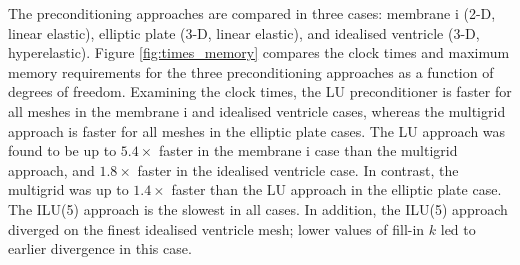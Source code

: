 \documentclass[sn-mathphys,Numbered]{sn-jnl}%
\begin{document}
The preconditioning approaches are compared in three cases: membrane i (2-D, linear elastic), elliptic plate (3-D, linear elastic), and idealised ventricle (3-D, hyperelastic).
 Figure \ref{fig:times_memory} compares the clock times and maximum memory requirements for the three preconditioning approaches as a function of degrees of freedom.
 Examining the clock times, the LU preconditioner is faster for all meshes in the membrane i and idealised ventricle cases, whereas the multigrid approach is faster for all meshes in the elliptic plate cases.
The LU approach was found to be up to $5.4 \times$ faster in the membrane i case than the multigrid approach, and $1.8 \times$ faster in the idealised ventricle case.
In contrast, the multigrid was up to $1.4 \times$ faster than the LU approach in the elliptic plate case.
The ILU(5) approach is the slowest in all cases.
In addition, the ILU(5) approach diverged on the finest idealised ventricle mesh; lower values of fill-in $k$ led to earlier divergence in this case.
\end{document}
